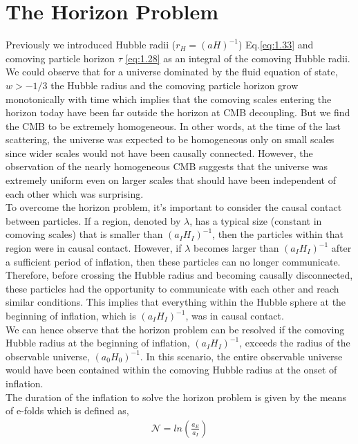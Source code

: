 \section{The Horizon Problem}
\hspace{0.5cm}Previously we introduced Hubble radii ($r_H = (aH)^{-1}$) Eq.\ref{eq:1.33} and comoving particle horizon $\tau$ \ref{eq:1.28} as an integral of the comoving Hubble radii. We could observe that for a universe dominated by the fluid equation of state, $w > -1/3 $ the Hubble radius  and the comoving particle horizon grow monotonically with time which implies that the comoving scales entering the horizon today have been far outside the horizon at CMB decoupling. But we find the CMB to be extremely homogeneous. In other words, at the time of the last scattering, the universe was expected to be homogeneous only on small scales since wider scales would not have been causally connected. However, the observation of the nearly homogeneous CMB suggests that the universe was extremely uniform even on larger scales that should have been independent of each other which was surprising.\\
\hspace{0.5cm}To overcome the horizon problem, it's important to consider the causal contact between particles. If a region, denoted by $\lambda$, has a typical size (constant in comoving scales) that is smaller than $(a_{I}H_{I})^{-1}$, then the particles within that region were in causal contact. However, if $\lambda$ becomes larger than $(a_{I}H_{I})^{-1}$ after a sufficient period of inflation, then these particles can no longer communicate. Therefore, before crossing the Hubble radius and becoming causally disconnected, these particles had the opportunity to communicate with each other and reach similar conditions. This implies that everything within the Hubble sphere at the beginning of inflation, which is $(a_{I}H_{I})^{-1}$, was in causal contact.\\
\hspace{0.5cm} We can hence observe that  the horizon problem can be resolved if the comoving Hubble radius at the beginning of inflation, $(a_I H_I)^{-1}$, exceeds the radius of the observable universe, $(a_0 H_0)^{-1}$. In this scenario, the entire observable universe would have been contained within the comoving Hubble radius at the onset of inflation.\\
The duration of the inflation to solve the horizon problem is given by the means of e-folds which is defined as,
\begin{align}
    \mathcal{N} = ln \left( \frac{a_E}{a_I} \right)
\end{align} \label{2.1}
